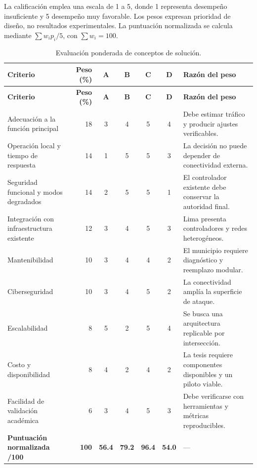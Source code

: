 La calificación emplea una escala de 1 a 5, donde 1 representa desempeño insuficiente y 5 desempeño muy
favorable. Los pesos expresan prioridad de diseño, no resultados experimentales. La puntuación normalizada se
calcula mediante $\sum w_i p_i/5$, con $\sum w_i = 100$.

\begin{landscape}
\footnotesize
\begin{longtable}{@{}p{5.0cm}rccccp{5.0cm}@{}}
\caption{Evaluación ponderada de conceptos de solución.}\label{tab:evaluacion-conceptos}\\
\toprule
\textbf{Criterio} & \textbf{Peso (\%)} & \textbf{A} & \textbf{B} & \textbf{C} & \textbf{D} & \textbf{Razón del peso}\\
\midrule
\endfirsthead
\toprule
\textbf{Criterio} & \textbf{Peso (\%)} & \textbf{A} & \textbf{B} & \textbf{C} & \textbf{D} & \textbf{Razón del peso}\\
\midrule
\endhead
\bottomrule
\endfoot
Adecuación a la función principal & 18 & 3 & 4 & 5 & 4 & Debe estimar tráfico y producir ajustes verificables.\\
Operación local y tiempo de respuesta & 14 & 1 & 5 & 5 & 3 & La decisión no puede depender de conectividad externa.\\
Seguridad funcional y modos degradados & 14 & 2 & 5 & 5 & 1 & El controlador existente debe conservar la autoridad final.\\
Integración con infraestructura existente & 12 & 3 & 4 & 5 & 3 & Lima presenta controladores y redes heterogéneos.\\
Mantenibilidad & 10 & 3 & 4 & 4 & 2 & El municipio requiere diagnóstico y reemplazo modular.\\
Ciberseguridad & 10 & 3 & 4 & 5 & 2 & La conectividad amplía la superficie de ataque.\\
Escalabilidad & 8 & 5 & 2 & 5 & 4 & Se busca una arquitectura replicable por intersección.\\
Costo y disponibilidad & 8 & 4 & 2 & 4 & 2 & La tesis requiere componentes disponibles y un piloto viable.\\
Facilidad de validación académica & 6 & 3 & 4 & 5 & 3 & Debe verificarse con herramientas y métricas reproducibles.\\
\midrule
\textbf{Puntuación normalizada /100} & \textbf{100} & \textbf{56.4} & \textbf{79.2} & \textbf{96.4} & \textbf{54.0} & ---\\
\bottomrule
\end{longtable}
\end{landscape}


